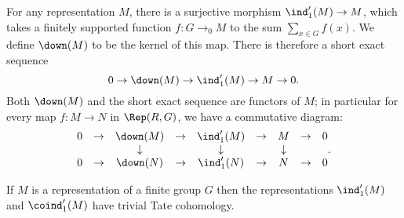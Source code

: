 
\begin{definition} \label{def:down}
	\leanok
	For any representation $M$, there is a surjective morphism $\ind_1'(M) \to M$,
	which takes a finitely supported function $f : G \to_0 M$ to the sum $\sum_{x \in G} f (x)$.
	We define $\down(M)$ to be the kernel of this map.
	There is therefore a short exact sequence
	\[
		0 \to \down(M) \to \ind_1'(M) \to M \to 0.
	\]
	Both $\down(M)$ and the short exact sequence are functors of $M$; in particular for
	every map $f : M \to N$ in $\Rep(R,G)$, we have a commutative diagram:
	\[
		\begin{matrix}
			0 & \to & \down(M) &\to &\ind_1'(M)& \to& M & \to & 0 \\
			&&\downarrow && \downarrow && \downarrow \\
			0 & \to & \down(N) &\to &\ind_1'(N)& \to& N & \to & 0
		\end{matrix} .
	\]
\end{definition}



\begin{lemma} \label{lem:induced' trivial Tate}
	\leanok
	If $M$ is a representation of a finite group $G$ then the representations
	$\ind_1'(M)$ and $\coind_1'(M)$ have trivial Tate cohomology.
\end{lemma}

